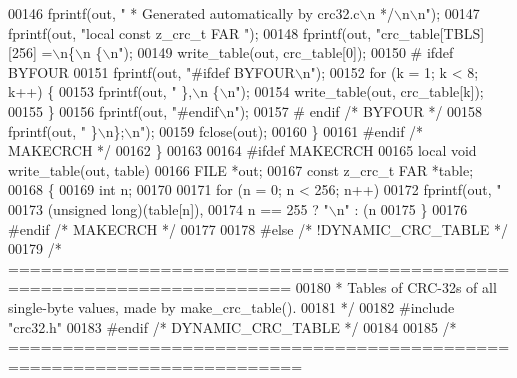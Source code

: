 \begin{DoxyCode}
00146         fprintf(out, \textcolor{stringliteral}{" * Generated automatically by crc32.c\(\backslash\)n */\(\backslash\)n\(\backslash\)n"});
00147         fprintf(out, \textcolor{stringliteral}{"local const z\_crc\_t FAR "});
00148         fprintf(out, \textcolor{stringliteral}{"crc\_table[TBLS][256] =\(\backslash\)n\{\(\backslash\)n  \{\(\backslash\)n"});
00149         write\_table(out, crc\_table[0]);
00150 \textcolor{preprocessor}{#  ifdef BYFOUR}
00151         fprintf(out, \textcolor{stringliteral}{"#ifdef BYFOUR\(\backslash\)n"});
00152         \textcolor{keywordflow}{for} (k = 1; k < 8; k++) \{
00153             fprintf(out, \textcolor{stringliteral}{"  \},\(\backslash\)n  \{\(\backslash\)n"});
00154             write\_table(out, crc\_table[k]);
00155         \}
00156         fprintf(out, \textcolor{stringliteral}{"#endif\(\backslash\)n"});
00157 \textcolor{preprocessor}{#  endif }\textcolor{comment}{/* BYFOUR */}\textcolor{preprocessor}{}
00158         fprintf(out, \textcolor{stringliteral}{"  \}\(\backslash\)n\};\(\backslash\)n"});
00159         fclose(out);
00160     \}
00161 \textcolor{preprocessor}{#endif }\textcolor{comment}{/* MAKECRCH */}\textcolor{preprocessor}{}
00162 \}
00163 
00164 \textcolor{preprocessor}{#ifdef MAKECRCH}
00165 local \textcolor{keywordtype}{void} write\_table(out, table)
00166     FILE *out;
00167     \textcolor{keyword}{const} z\_crc\_t FAR *table;
00168 \{
00169     \textcolor{keywordtype}{int} n;
00170 
00171     \textcolor{keywordflow}{for} (n = 0; n < 256; n++)
00172         fprintf(out, \textcolor{stringliteral}{"%
00173                 (\textcolor{keywordtype}{unsigned} \textcolor{keywordtype}{long})(table[n]),
00174                 n == 255 ? \textcolor{stringliteral}{"\(\backslash\)n"} : (n %
00175 \}
00176 \textcolor{preprocessor}{#endif }\textcolor{comment}{/* MAKECRCH */}\textcolor{preprocessor}{}
00177 
00178 \textcolor{preprocessor}{#else }\textcolor{comment}{/* !DYNAMIC\_CRC\_TABLE */}\textcolor{preprocessor}{}
00179 \textcolor{comment}{/* ========================================================================}
00180 \textcolor{comment}{ * Tables of CRC-32s of all single-byte values, made by make\_crc\_table().}
00181 \textcolor{comment}{ */}
00182 \textcolor{preprocessor}{#include "crc32.h"}
00183 \textcolor{preprocessor}{#endif }\textcolor{comment}{/* DYNAMIC\_CRC\_TABLE */}\textcolor{preprocessor}{}
00184 
00185 \textcolor{comment}{/* =========================================================================}
}
\end{DoxyCode}
